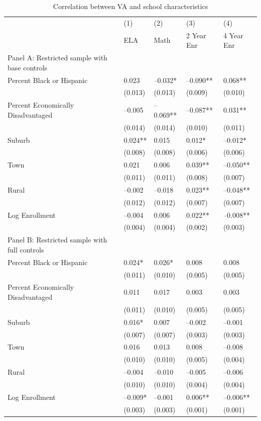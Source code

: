 \begin{table}[tbp] \centering
{}

\caption{Correlation between VA and school characteristics}
{\footnotesize
\begin{tabularx}{\linewidth}{lCCCC}

\toprule
&{(1)}&{(2)}&{(3)}&{(4)} \tabularnewline
{} & ELA & Math & 2 Year Enr & 4 Year Enr \tabularnewline
\midrule \addlinespace[\belowrulesep]
Panel A: Restricted sample with base controls&&&& \tabularnewline
\midrule Percent Black or Hispanic&0.023&--0.032*&--0.090**&0.068** \tabularnewline
&(0.013)&(0.013)&(0.009)&(0.010) \tabularnewline
\midrule Percent Economically Disadvantaged&--0.005&--0.069**&--0.087**&0.031** \tabularnewline
&(0.014)&(0.014)&(0.010)&(0.011) \tabularnewline
\midrule Suburb&0.024**&0.015&0.012*&--0.012* \tabularnewline
&(0.008)&(0.008)&(0.006)&(0.006) \tabularnewline
Town&0.021&0.006&0.039**&--0.050** \tabularnewline
&(0.011)&(0.011)&(0.008)&(0.007) \tabularnewline
Rural&--0.002&--0.018&0.023**&--0.048** \tabularnewline
&(0.012)&(0.012)&(0.007)&(0.007) \tabularnewline
\midrule Log Enrollment&--0.004&0.006&0.022**&--0.008** \tabularnewline
&(0.004)&(0.004)&(0.002)&(0.003) \tabularnewline
\midrule \midrule Panel B: Restricted sample with full controls&&&& \tabularnewline
\midrule Percent Black or Hispanic&0.024*&0.026*&0.008&0.008 \tabularnewline
&(0.011)&(0.010)&(0.005)&(0.005) \tabularnewline
\midrule Percent Economically Disadvantaged&0.011&0.017&0.003&0.003 \tabularnewline
&(0.011)&(0.010)&(0.005)&(0.005) \tabularnewline
\midrule Suburb&0.016*&0.007&--0.002&--0.001 \tabularnewline
&(0.007)&(0.007)&(0.003)&(0.003) \tabularnewline
Town&0.016&0.013&0.008&--0.008 \tabularnewline
&(0.010)&(0.010)&(0.005)&(0.004) \tabularnewline
Rural&--0.004&--0.010&--0.005&--0.006 \tabularnewline
&(0.010)&(0.010)&(0.004)&(0.004) \tabularnewline
\midrule Log Enrollment&--0.009*&--0.001&0.006**&--0.006** \tabularnewline
&(0.003)&(0.003)&(0.001)&(0.001) \tabularnewline
\bottomrule 

\end{tabularx}
}
\end{table}
